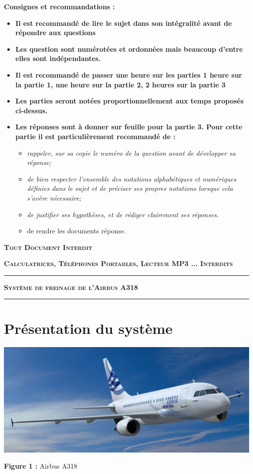 \documentclass[10pt,oneside]{article}
\begin{document}
\vfill

\textbf{Consignes et recommandations :}
\begin{itemize}
\item \textbf{Il est recommandé de lire le sujet dans son intégralité avant de
répondre aux questions}
\item \textbf{Les question sont numérotées et ordonnées mais beaucoup d'entre elles sont indépendantes.}
\item \textbf{Il est recommandé de passer une heure sur les parties 1 heure sur la partie 1, une heure sur la partie 2, 2 heures sur la partie 3}
\item \textbf{Les parties seront notées proportionnellement aux temps proposés ci-dessus.}
\item \textbf{Les réponses sont à donner sur feuille pour la partie 3. Pour cette partie il est particulièrement recommandé de :}
\begin{itemize}
\item \textit{rappeler, sur sa copie le numéro de la question avant de développer sa réponse;}
\item \textit{de bien respecter l'ensemble des notations alphabétiques et numériques définies dans le sujet et de préciser ses propres notations lorsque cela s'avère nécessaire;}
\item \textit{de justifier ses hypothèses, et de rédiger clairement ses réponses.}
\item de rendre les documents réponse.

\end{itemize}
\end{itemize}

\vfill

\begin{center}
\textsc{\textbf{Tout Document Interdit}}

 \textsc{\textbf{Calculatrices, Téléphones Portables, Lecteur MP3 ...
Interdits}}
\end{center}

\newpage

\noindent\rule{\linewidth}{.2pt}
\begin{center}
 \LARGE\textbf{\textsc{
Système de freinage de l'Airbus A318
}}
\end{center}
\noindent\rule{\linewidth}{.2pt}

\section{Présentation du système}
\begin{center}
\includegraphics[width=.8\textwidth]{png/image1.png}

\textbf{Figure 1 :} Airbus A318
\end{center}
\end{document}
